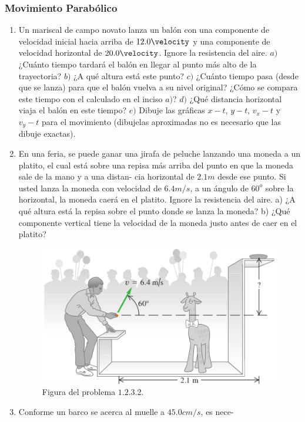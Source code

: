 \subsubsection{Movimiento Parabólico}
	\begin{enumerate}
		\item Un mariscal de campo novato lanza un balón con una componente
        de velocidad inicial hacia arriba de $12.0 \velocity$ y una componente
        de velocidad horizontal de $20.0 \velocity$. Ignore la resistencia del aire.
        $a)$ ¿Cuánto tiempo tardará el balón en llegar al punto más alto de la
        trayectoria? $b)$ ¿A qué altura está este punto? $c)$ ¿Cuánto tiempo pasa
        (desde que se lanza) para que el balón vuelva a su nivel original?
        ¿Cómo se compara este tiempo con el calculado en el inciso $a)$?
        $d)$ ¿Qué distancia horizontal viaja el balón en este tiempo? $e)$ Dibuje
        las gráficas $x-t$, $y-t$, $v_x-t$ y $v_y-t$ para el movimiento (dibujelas aproximadas no es necesario que las dibuje exactas).
        \item En una feria, se puede ganar una jirafa de
peluche lanzando una moneda a un platito, el cual está sobre una repisa
más arriba del punto en que la moneda sale de la mano y a una distan-
cia horizontal de $2.1 m$ desde ese punto. Si usted lanza
la moneda con velocidad de $6.4 m/s$, a un ángulo de $60^o$ sobre la horizontal, la moneda caerá en el platito. Ignore la resistencia del aire. a) ¿A qué altura está la repisa sobre el punto donde se lanza la moneda?
b) ¿Qué componente vertical tiene la velocidad de la moneda justo
antes de caer en el platito?
		\begin{figure}[H]
			\centering
			\includegraphics[scale=0.5]{Images/feria.png}
			\caption{Figura del problema $1.2.3.2.$}
			\label{1.2.3.2}
		\end{figure}
		\item Conforme un barco se acerca al muelle a $45.0 cm/s$, es nece-

\end{enumerate}
